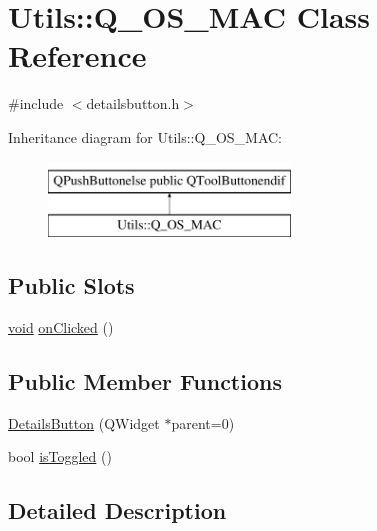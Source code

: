 \hypertarget{class_utils_1_1_q___o_s___m_a_c}{\section{Utils\-:\-:Q\-\_\-\-O\-S\-\_\-\-M\-A\-C Class Reference}
\label{class_utils_1_1_q___o_s___m_a_c}
}


{\ttfamily \#include $<$detailsbutton.\-h$>$}

Inheritance diagram for Utils\-:\-:Q\-\_\-\-O\-S\-\_\-\-M\-A\-C\-:\begin{figure}[H]
\begin{center}
\leavevmode
\includegraphics[height=2.000000cm]{class_utils_1_1_q___o_s___m_a_c}
\end{center}
\end{figure}
\subsection*{Public Slots}
\begin{DoxyCompactItemize}
\item 
\hyperlink{group___u_a_v_objects_plugin_ga444cf2ff3f0ecbe028adce838d373f5c}{void} \hyperlink{class_utils_1_1_q___o_s___m_a_c_a9ceef4b11c2dba27d8d6a18638c6853a}{on\-Clicked} ()
\end{DoxyCompactItemize}
\subsection*{Public Member Functions}
\begin{DoxyCompactItemize}
\item 
\hyperlink{class_utils_1_1_q___o_s___m_a_c_ae940f49a9ec83eb62c66dbf44ecf3a8f}{Details\-Button} (Q\-Widget $\ast$parent=0)
\item 
bool \hyperlink{class_utils_1_1_q___o_s___m_a_c_a8af48a4549b49ef89a54eba173171388}{is\-Toggled} ()
\end{DoxyCompactItemize}


\subsection{Detailed Description}


